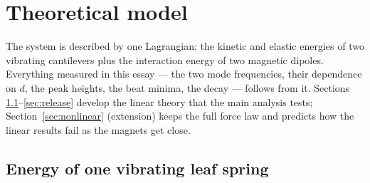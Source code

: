 \documentclass[11pt,a4paper]{article}
\begin{document}
\section{Theoretical model}\label{sec:theory}

The system is described by one Lagrangian: the kinetic and elastic energies of two vibrating cantilevers plus the interaction energy of two magnetic dipoles. Everything measured in this essay --- the two mode frequencies, their dependence on $d$, the peak heights, the beat minima, the decay --- follows from it. Sections \ref{sec:beam}--\ref{sec:release} develop the linear theory that the main analysis tests; Section~\ref{sec:nonlinear} (extension) keeps the full force law and predicts how the linear results fail as the magnets get close.

\subsection{Energy of one vibrating leaf spring}\label{sec:beam}
\end{document}
